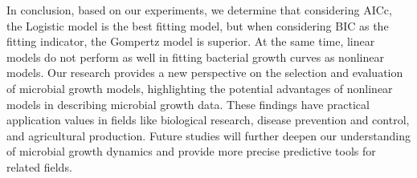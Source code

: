 \documentclass[11pt]{article}
\begin{document}
\begin{linenumbers}
In conclusion, based on our experiments, we determine that considering AICc, the Logistic model is the best fitting model, but when considering BIC as the fitting indicator, the Gompertz model is superior. At the same time, linear models do not perform as well in fitting bacterial growth curves as nonlinear models. Our research provides a new perspective on the selection and evaluation of microbial growth models, highlighting the potential advantages of nonlinear models in describing microbial growth data. These findings have practical application values in fields like biological research, disease prevention and control, and agricultural production. Future studies will further deepen our understanding of microbial growth dynamics and provide more precise predictive tools for related fields.


    
    
    
    
    \end{linenumbers}
\end{document}
